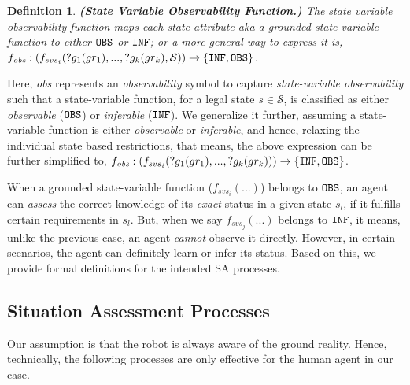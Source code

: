\documentclass[letterpaper]{article} %
\newtheorem{definition}{Definition}
\begin{document}
\begin{definition} \label{def:svof}
\textbf{(State Variable Observability Function.)} 
The state variable observability function maps each state attribute {\em aka} a grounded \textit{state-variable function} 
to either $\texttt{OBS}$ or $\texttt{INF}$; or a more general way to express it is, $f_{\textit{obs}}: (f_{svs_i}(?g_1(gr_1),...,?g_k(gr_k),\mathcal{S}
)) \rightarrow 
    \{\texttt{INF}, \texttt{OBS}\}$.
\end{definition}
Here, \textit{obs} represents an \textit{observability} symbol to capture \textit{state-variable observability} such that a state-variable function, for a legal state $s\in\mathcal{S}$, is classified as either \textit{observable} ($\texttt{OBS}$) or \textit{inferable} ($\texttt{INF}$). 
We generalize it further, assuming a state-variable function is either \textit{observable} or \textit{inferable}, and hence, relaxing the individual state based restrictions, that means, the above expression can be further simplified to, 
$f_{\textit{obs}}: (f_{svs_i}(?g_1(gr_1),...,?g_k(gr_k))) \rightarrow \{\texttt{INF}, \texttt{OBS}\}$.

When a grounded state-variable function ($f_{svs_i}(...)$) belongs to $\texttt{OBS}$, an agent can \textit{assess} the correct knowledge of its \textit{exact} status in a given state $s_l$, if it fulfills certain requirements in $s_l$. 
But, when we say $f_{svs_j}(...)$ belongs to $\texttt{INF}$, it means, unlike the previous case, an agent \textit{cannot} observe it directly. 
However, in certain scenarios, the agent can definitely learn or infer its status. Based on this, we provide formal definitions for the intended SA processes.

\subsection{Situation Assessment Processes}
Our assumption is that the robot is always aware of the ground reality. 
Hence, technically, the following processes are only effective for the human agent in our case. 
\end{document}
